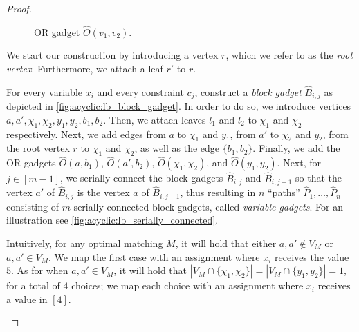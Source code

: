 \begin{proof}
\begin{figure}[htb]
        \caption{OR gadget $\hat{O}(v_1,v_2)$.}
        \label{fig:acyclic:lb_or_gadget}
    \end{figure}

    We start our construction by introducing a vertex $r$, which we refer to as the \emph{root vertex}.
    Furthermore, we attach a leaf $r'$ to $r$.


    For every variable $x_i$ and every constraint $c_j$,
    construct a \emph{block gadget} $\hat{B}_{i,j}$ as depicted in \cref{fig:acyclic:lb_block_gadget}.
    In order to do so, we introduce vertices $a, a', \chi_1, \chi_2, y_1, y_2, b_1, b_2$.
    Then, we attach leaves $l_1$ and $l_2$ to $\chi_1$ and $\chi_2$ respectively.
    Next, we add edges from $a$ to $\chi_1$ and $y_1$, from $a'$ to $\chi_2$ and $y_2$,
    from the root vertex $r$ to $\chi_1$ and $\chi_2$, as well as the edge $\{b_1,b_2\}$.
    Finally, we add the OR gadgets $\hat{O}(a,b_1)$, $\hat{O}(a',b_2)$, $\hat{O}(\chi_1,\chi_2)$,
    and $\hat{O}(y_1,y_2)$.
    Next, for $j \in [m-1]$, we serially connect the block gadgets $\hat{B}_{i,j}$ and $\hat{B}_{i,j+1}$ so that the vertex $a'$ of $\hat{B}_{i,j}$ is the vertex $a$ of $\hat{B}_{i,j+1}$,
    thus resulting in $n$ ``paths'' $\hat{P}_1, \ldots, \hat{P}_n$ consisting of $m$ serially connected block gadgets, called \emph{variable gadgets}.
    For an illustration see \cref{fig:acyclic:lb_serially_connected}.

    Intuitively, for any optimal matching $M$,
    it will hold that either $a, a' \notin V_M$ or $a, a' \in V_M$.
    We map the first case with an assignment where $x_i$ receives the value $5$.
    As for when $a, a' \in V_M$, it will hold that $|V_M \cap \{\chi_1,\chi_2\}| = |V_M \cap \{y_1,y_2\}| = 1$,
    for a total of $4$ choices;
    we map each choice with an assignment where $x_i$ receives a value in $[4]$.


    \begin{figure}[ht]
        \centering
          \begin{subfigure}[b]{0.4\linewidth}
          \centering
            \begin{tikzpicture}[scale=0.75, transform shape]


\end{tikzpicture}
\end{subfigure}
\end{figure}
\end{proof}
